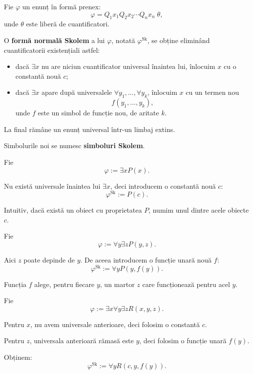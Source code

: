 \begin{definition}
	Fie \( \varphi \) un enunț în formă prenex:
	\[
		\varphi = Q_1x_1Q_2x_2\cdots Q_nx_n \; \theta,
	\]
	unde \( \theta \) este liberă de cuantificatori.

	O \textbf{formă normală Skolem} a lui \( \varphi \), notată \( \varphi^{\mathrm{Sk}} \), se obține eliminând cuantificatorii existențiali astfel:
	\begin{itemize}
		\item dacă \( \exists x \) nu are niciun cuantificator universal înaintea lui, înlocuim \(x\) cu o constantă nouă \(c\);
		\item dacă \( \exists x \) apare după universalele \( \forall y_1,\dots,\forall y_k \), înlocuim \(x\) cu un termen nou
		      \[
			      f(y_1,\dots,y_k),
		      \]
		      unde \(f\) este un simbol de funcție nou, de aritate \(k\).
	\end{itemize}
	La final rămâne un enunț universal într-un limbaj extins.
\end{definition}

Simbolurile noi se numesc \textbf{simboluri Skolem}.

\begin{eg}
	Fie
	\[
		\varphi := \exists x P(x).
	\]

	Nu există universale înaintea lui \( \exists x \), deci introducem o constantă nouă \(c\):
	\[
		\varphi^{\mathrm{Sk}} := P(c).
	\]

	Intuitiv, dacă există un obiect cu proprietatea \(P\), numim unul dintre acele obiecte \(c\).
\end{eg}

\begin{eg}
	Fie
	\[
		\varphi := \forall y \exists z P(y,z).
	\]

	Aici \(z\) poate depinde de \(y\). De aceea introducem o funcție unară nouă \(f\):
	\[
		\varphi^{\mathrm{Sk}} := \forall y P(y,f(y)).
	\]

	Funcția \(f\) alege, pentru fiecare \(y\), un martor \(z\) care funcționează pentru acel \(y\).
\end{eg}

\begin{eg}
	Fie
	\[
		\varphi := \exists x\forall y\exists z R(x,y,z).
	\]

	Pentru \(x\), nu avem universale anterioare, deci folosim o constantă \(c\).

	Pentru \(z\), universala anterioară rămasă este \(y\), deci folosim o funcție unară \(f(y)\).

	Obținem:
	\[
		\varphi^{\mathrm{Sk}} := \forall y R(c,y,f(y)).
	\]
\end{eg}

